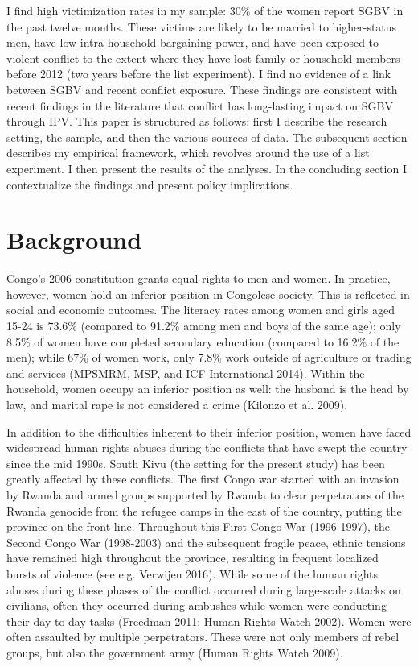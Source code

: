 \documentclass[
]{article}
\begin{document}
I find high victimization rates in my sample: 30\% of the women report
SGBV in the past twelve months. These victims are likely to be married
to higher-status men, have low intra-household bargaining power, and
have been exposed to violent conflict to the extent where they have lost
family or household members before 2012 (two years before the list
experiment). I find no evidence of a link between SGBV and recent
conflict exposure. These findings are consistent with recent findings in
the literature that conflict has long-lasting impact on SGBV through
IPV. This paper is structured as follows: first I describe the research
setting, the sample, and then the various sources of data. The
subsequent section describes my empirical framework, which revolves
around the use of a list experiment. I then present the results of the
analyses. In the concluding section I contextualize the findings and
present policy implications.

\section*{Background}\label{background}

Congo's 2006 constitution grants equal rights to men and women. In
practice, however, women hold an inferior position in Congolese society.
This is reflected in social and economic outcomes. The literacy rates
among women and girls aged 15-24 is 73.6\% (compared to 91.2\% among men
and boys of the same age); only 8.5\% of women have completed secondary
education (compared to 16.2\% of the men); while 67\% of women work,
only 7.8\% work outside of agriculture or trading and services (MPSMRM,
MSP, and ICF International 2014). Within the household, women occupy an
inferior position as well: the husband is the head by law, and marital
rape is not considered a crime (Kilonzo et al. 2009).

In addition to the difficulties inherent to their inferior position,
women have faced widespread human rights abuses during the conflicts
that have swept the country since the mid 1990s. South Kivu (the setting
for the present study) has been greatly affected by these conflicts. The
first Congo war started with an invasion by Rwanda and armed groups
supported by Rwanda to clear perpetrators of the Rwanda genocide from
the refugee camps in the east of the country, putting the province on
the front line. Throughout this First Congo War (1996-1997), the Second
Congo War (1998-2003) and the subsequent fragile peace, ethnic tensions
have remained high throughout the province, resulting in frequent
localized bursts of violence (see e.g. Verwijen 2016). While some of the
human rights abuses during these phases of the conflict occurred during
large-scale attacks on civilians, often they occurred during ambushes
while women were conducting their day-to-day tasks (Freedman 2011; Human
Rights Watch 2002). Women were often assaulted by multiple perpetrators.
These were not only members of rebel groups, but also the government
army (Human Rights Watch 2009).
\end{document}
